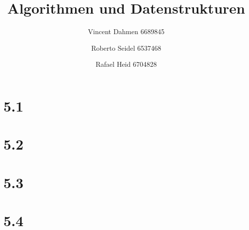 \documentclass[12pt,a4paper]{article}
\title{Algorithmen und Datenstrukturen}
\author{Vincent Dahmen 6689845 \and Roberto Seidel 6537468 \and Rafael Heid 6704828}
\begin{document}
\maketitle{}


\section*{5.1}


\section*{5.2}


\section*{5.3}


\section*{5.4}

\end{document}

